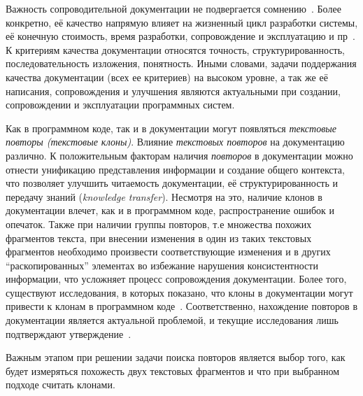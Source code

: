 Важность сопроводительной документации не подвергается сомнению~\cite{kipyegen2013importance,chomal2014significance}.
Более конкретно, её качество напрямую влияет на жизненный цикл разработки системы, её конечную стоимость, время разработки, сопровождение и эксплуатацию и пр~\cite{plosch2014value}. 
К критериям качества документации относятся точность, структурированность, последовательность изложения, понятность.
Иными словами, задачи поддержания качества документации (всех ее критериев) на высоком уровне, а так же её написания, сопровождения и улучшения являются актуальными при создании, сопровождении и эксплуатации программных систем.

Как в программном коде, так и в документации могут появляться \emph{текстовые повторы (текстовые клоны)}.
Влияние  \emph{текстовых повторов} на документацию различно.
К положительным факторам наличия \emph{повторов} в документации можно отнести
унификацию представления информации и создание общего контекста, что позволяет улучшить читаемость документации, её структурированность и передачу знаний (\emph{knowledge transfer}).
Несмотря на это, наличие клонов в документации влечет, как и в программном коде,  распространение ошибок и опечаток.
Также при наличии группы повторов, т.е множества похожих  фрагментов текста, при внесении изменения в один из таких текстовых фрагментов необходимо произвести соответствующие изменения и в других ``раскопированных'' элементах во избежание нарушения консистентности информации, что усложняет процесс сопровождения документации.
Более того, существуют исследования, в которых показано, что клоны в документации могут привести к клонам в программном коде~\cite{juergens2010can}.
Соответственно, нахождение повторов в документации является актуальной проблемой, и текущие исследования лишь подтверждают утверждение~\cite{horie2010tool, poruban2014reusable, poruban2016preliminary, juergens2010can, oumaziz2017documentation}.

Важным этапом при решении задачи поиска повторов является выбор того, как будет измеряться похожесть двух текстовых фрагментов и что при выбранном подходе считать клонами.

